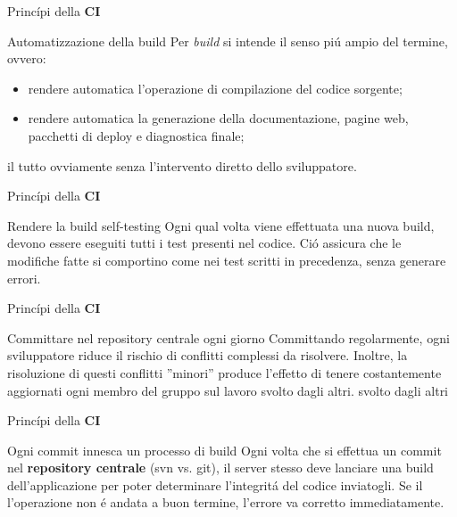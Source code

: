 \documentclass{beamer}
\begin{document}
\begin{frame}{Princ\'ipi della \textbf{CI}}
\begin{block}{Automatizzazione della build}
Per \emph{build} si intende il senso pi\'u ampio del termine, ovvero:
\begin{itemize}
\item rendere automatica l'operazione di compilazione del codice sorgente;
\item rendere automatica la generazione della documentazione, pagine web, pacchetti di deploy e diagnostica finale;
\end{itemize}
il tutto ovviamente senza l'intervento diretto dello sviluppatore.
\end{block}
\end{frame}

\begin{frame}{Princ\'ipi della \textbf{CI}}
\begin{block}{Rendere la build self-testing}
Ogni qual volta viene effettuata una nuova build, devono essere eseguiti tutti i test presenti nel codice. Ci\'o assicura che le 
modifiche fatte si comportino come nei test scritti in precedenza, senza generare errori.
\end{block}
\end{frame}

\begin{frame}{Princ\'ipi della \textbf{CI}}
\begin{block}{Committare nel repository centrale ogni giorno}
Committando regolarmente, ogni sviluppatore riduce il rischio di conflitti complessi da risolvere. Inoltre, la risoluzione di questi
conflitti ''minori'' produce l'effetto di tenere costantemente aggiornati ogni membro del gruppo sul lavoro svolto dagli altri.
svolto dagli altri
\end{block}
\end{frame}

\begin{frame}{Princ\'ipi della \textbf{CI}}
\begin{block}{Ogni commit innesca un processo di build}
Ogni volta che si effettua un commit nel \textbf{repository centrale} (svn vs. git), il server stesso deve lanciare una build dell'applicazione per poter determinare l'integrit\'a del codice inviatogli. Se il
l'operazione non \'e andata a buon termine, l'errore va corretto immediatamente.
\end{block}
\end{frame}
\end{document}
